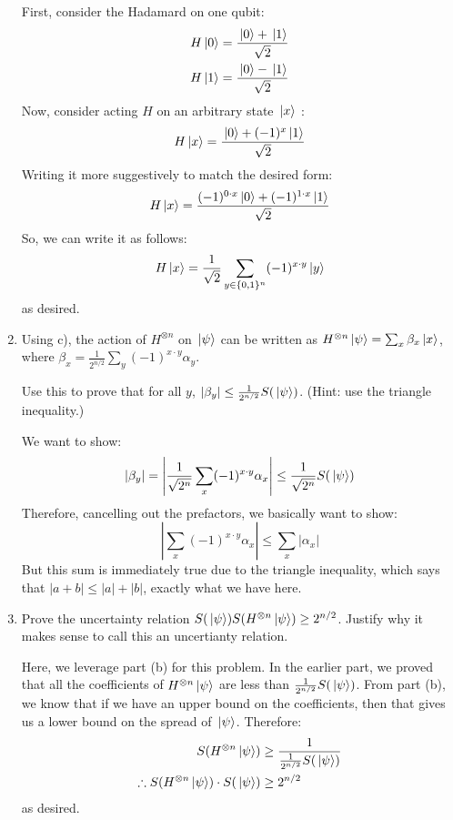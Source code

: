 \documentclass[10pt]{article}
\begin{document}
\begin{enumerate}[label=\alph*)]
\begin{solution}
				First, consider the Hadamard on one qubit: 
				\begin{align*}
					H \ket*{0} &= \frac{\ket*{0} + \ket*{1}}{\sqrt{2} }\\
					H \ket*{1} &= \frac{\ket*{0} - \ket*{1}}{\sqrt{2} } 
				\end{align*}
				Now, consider acting \( H \) on an arbitrary state \( \ket*{x} \) :
				\[
				H\ket*{x} = \frac{\ket*{0} + (-1)^{x} \ket*{1}}{\sqrt{2} }
				\]  
				Writing it more suggestively to match the desired form:
				\[
				H \ket*{x} = \frac{(-1)^{0 \cdot x}\ket*{0} + (-1)^{1 \cdot x}\ket*{1}}{\sqrt{2} }
				\] 
				So, we can write it as follows: 
				\[
				H \ket*{x} = \frac{1}{\sqrt{2} }\sum_{y \in \{0, 1\}^{n} }(-1)^{x \cdot y} \ket*{y}
				\] 
				as desired. 
			\end{solution}
		\item Using c), the action of  \( H^{\otimes n} \) on \( \ket*{\psi} \) can be written as 
			\( H^{\otimes n}\ket*{\psi} = \sum_x \beta_x \ket*{x} \), where 
			\( \beta_x = \frac{1}{2^{n / 2}}\sum_y (-1)^{x \cdot y}\alpha_y \). 
			
			Use this to prove that for all \( y \), \( |\beta_y| \le \frac{1}{2^{n / 2}}S(\ket*{\psi}) \). 
			(Hint: use the triangle inequality.)

			\begin{solution}
				We want to show:
				\[
				|\beta_y| = \left|\frac{1}{\sqrt{2^{n}} }\sum_x (-1)^{x \cdot y}\alpha_x\right| \le \frac{1}{\sqrt{2^{n}} }
				S(\ket*{\psi})
				\] 
				Therefore, cancelling out the prefactors, we basically want to show:
				\[
				\left| \sum_x (-1)^{x \cdot y}\alpha_x \right| \le \sum_x |\alpha_x|
				\] 
				But this sum is immediately true due to the triangle inequality, which says that \( |a + b|
				\le |a| + |b|\), exactly what we have here.  
			\end{solution}
		\item Prove the uncertainty relation \( S(\ket*{\psi}) S(H^{\otimes n} \ket*{\psi}) \ge 2^{n / 2} \). 
			Justify why it makes sense to call this an uncertianty relation. 

			\begin{solution}
				Here, we leverage part (b) for this problem. In the earlier part, we proved that all 
				the coefficients of \( H^{\otimes n}\ket*{ \psi} \) are less than \( \frac{1}{2^{n / 2}}
				S(\ket*{\psi})\). From part (b), we know that if we have an upper bound on the coefficients, then 
				that gives us a lower bound on the spread of \( \ket*{\psi} \). Therefore: 
				\begin{align*}
					S(H^{\otimes n}\ket*{\psi}) & \ge \frac{1}{\frac{1}{2^{n / 2}}S(\ket*{\psi})}\\
					\therefore S(H^{\otimes n}\ket*{\psi}) \cdot S(\ket*{\psi}) &\ge 2^{n / 2}
				\end{align*}
				as desired. 
			\end{solution}
	\end{enumerate}
\end{document}
